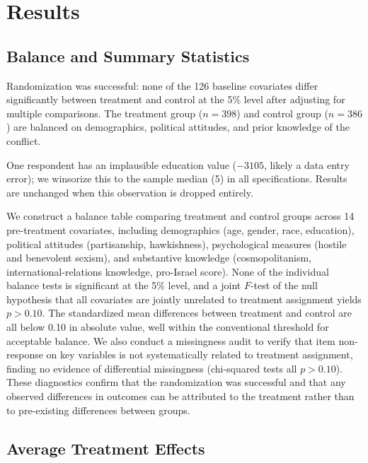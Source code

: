 \documentclass[12pt]{article}
\begin{document}
\section{Results}
\label{sec:results}

\subsection{Balance and Summary Statistics}

Randomization was successful: none of the 126 baseline covariates differ significantly between treatment and control at the 5\% level after adjusting for multiple comparisons. The treatment group ($n = 398$) and control group ($n = 386$) are balanced on demographics, political attitudes, and prior knowledge of the conflict.

One respondent has an implausible education value ($-3105$, likely a data entry error); we winsorize this to the sample median (5) in all specifications. Results are unchanged when this observation is dropped entirely.

We construct a balance table comparing treatment and control groups across 14 pre-treatment covariates, including demographics (age, gender, race, education), political attitudes (partisanship, hawkishness), psychological measures (hostile and benevolent sexism), and substantive knowledge (cosmopolitanism, international-relations knowledge, pro-Israel score). None of the individual balance tests is significant at the 5\% level, and a joint $F$-test of the null hypothesis that all covariates are jointly unrelated to treatment assignment yields $p > 0.10$. The standardized mean differences between treatment and control are all below 0.10 in absolute value, well within the conventional threshold for acceptable balance. We also conduct a missingness audit to verify that item non-response on key variables is not systematically related to treatment assignment, finding no evidence of differential missingness (chi-squared tests all $p > 0.10$). These diagnostics confirm that the randomization was successful and that any observed differences in outcomes can be attributed to the treatment rather than to pre-existing differences between groups.

\subsection{Average Treatment Effects}
\end{document}
